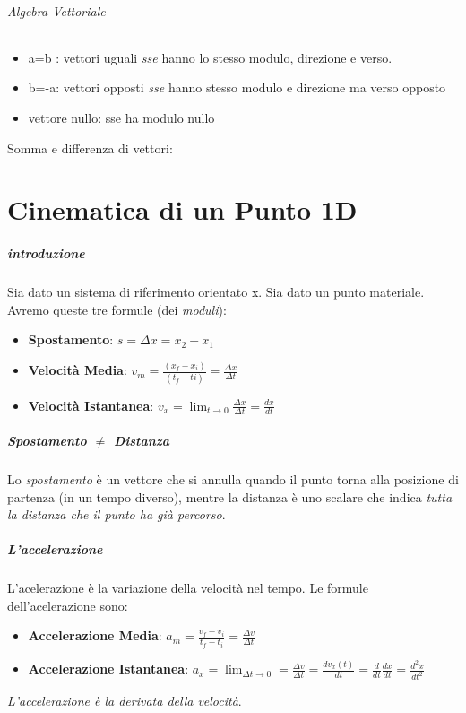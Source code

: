 \documentclass[12pt, a4paper, openany]{book}
\begin{document}
\subparagraph*{Algebra Vettoriale}

\begin{itemize}
    \item a=b : vettori uguali \emph{sse} hanno lo stesso modulo, direzione e verso.
    \item b=-a: vettori opposti \emph{sse} hanno stesso modulo e direzione ma verso opposto
    \item vettore nullo: sse ha modulo nullo
\end{itemize}
Somma e differenza di vettori:

\chapter{Cinematica di un Punto 1D}
\paragraph{introduzione}
Sia dato un sistema di riferimento orientato x.
Sia dato un punto materiale.
Avremo queste tre formule (dei \emph{moduli}):
\begin{itemize}
    \item \textbf{Spostamento}: $s=\Delta x = x_2-x_1$
    \item \textbf{Velocità Media}: $v_m = \frac{(x_f-x_i)}{(t_f-ti)} = \frac{\Delta x}{\Delta t}$
    \item \textbf{Velocità Istantanea}: $v_x = \lim_{t\to 0} \frac{\Delta x}{\Delta t} = \frac{dx}{dt}$
\end{itemize}
\paragraph{Spostamento $\neq$ Distanza}
Lo \emph{spostamento} è un vettore che si annulla quando il punto torna alla posizione di partenza (in un tempo diverso),
mentre la distanza è uno scalare che indica \emph{tutta la distanza che il punto ha già percorso}.
\paragraph{L'accelerazione} L'acelerazione è la variazione della velocità nel tempo.
Le formule dell'acelerazione sono:
\begin{itemize}
    \item \textbf{Accelerazione Media}: $a_m = \frac{v_f-v_i}{t_f-t_i} = \frac{\Delta v}{\Delta t}$
    \item \textbf{Accelerazione Istantanea}: $a_x = \lim_{\Delta t \to 0} = \frac{\Delta v}{\Delta t} = \frac{dv_x(t)}{dt}= \frac{d}{dt}\frac{dx}{dt} = \frac{d^2x}{dt^2}$
\end{itemize}
\emph{L'accelerazione è la derivata della velocità}.
\end{document}
